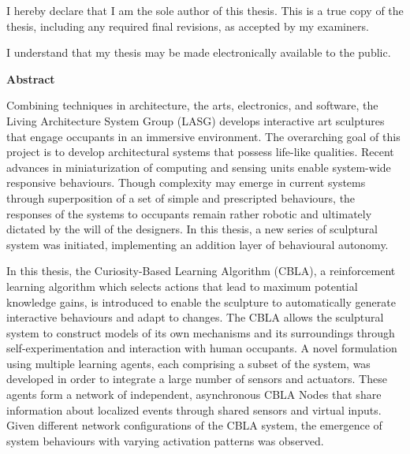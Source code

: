 \cleardoublepage %
 


  \noindent
I hereby declare that I am the sole author of this thesis. This is a true copy of the thesis, including any required final revisions, as accepted by my examiners.

  \bigskip
  
  \noindent
I understand that my thesis may be made electronically available to the public.

\cleardoublepage


\begin{center}\textbf{Abstract}\end{center}

Combining techniques in architecture, the arts, electronics, and software, the Living Architecture System Group (LASG) develops interactive art sculptures that engage occupants in an immersive environment. The overarching goal of this project is to develop architectural systems that possess life-like qualities. Recent advances in miniaturization of computing and sensing units enable system-wide responsive behaviours. Though complexity may emerge in current systems through superposition of a set of simple and prescripted behaviours, the responses of the systems to occupants remain rather robotic and ultimately dictated by the will of the designers. In this thesis, a new series of sculptural system was initiated, implementing an addition layer of behavioural autonomy.  

In this thesis, the Curiosity-Based Learning Algorithm (CBLA), a reinforcement learning algorithm which selects actions that lead to maximum potential knowledge gains, is introduced to enable the sculpture to automatically generate interactive behaviours and adapt to changes. The CBLA allows the sculptural system to construct models of its own mechanisms and its surroundings through self-experimentation and interaction with human occupants. A novel formulation using multiple learning agents, each comprising a subset of the system, was developed in order to integrate a large number of sensors and actuators. These agents form a network of independent, asynchronous CBLA Nodes that share information about localized events through shared sensors and virtual inputs. Given different network configurations of the CBLA system, the emergence of system behaviours with varying activation patterns was observed. 

